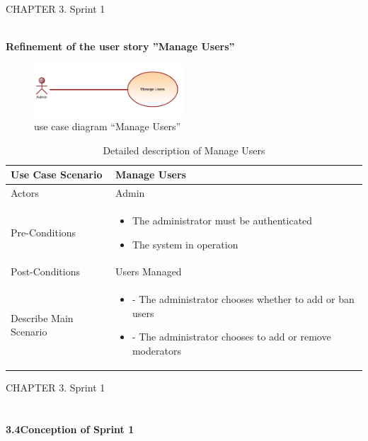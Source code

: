 \documentclass{article}
\begin{document}
{{{{{{{\newpage
\noindent
CHAPTER 3.  Sprint 1 \\
\underline{\hspace{\textwidth}} \vspace{0.2cm}\\
{\large \textbf{Refinement of the user story ”Manage Users”}
\begin{figure}[htbp]
    \centering
    \includegraphics[width=0.5\textwidth]{muse}
    \caption{use case diagram “Manage Users”}
    \label{fig:design2}
\end{figure}
\begin{table}[h]
    \centering
    \begin{tabularx}{\textwidth}{X|X}
        \toprule
        Use Case Scenario & Manage Users \\
        \midrule
        Actors & Admin \\
        \midrule
        Pre-Conditions & \begin{itemize}[label=$\bullet$]
\item The administrator must be authenticated 
\item The system in operation
 \end{itemize} \\
        \midrule
	 Post-Conditions & Users Managed  \\
        \midrule
        Describe Main Scenario &  \begin{itemize}[label=$\bullet$]
            \item - The administrator chooses whether to add or ban users
            \item- The administrator chooses to add or remove moderators
    
        \end{itemize} \\
        \bottomrule
    \end{tabularx}
    \caption{Detailed description of Manage Users}
    \label{tab:actors_roles}
\end{table}



\newpage
\noindent
CHAPTER 3.  Sprint 1 \\
\underline{\hspace{\textwidth}} \vspace{0.2cm}\\
\\{\Large \textbf{3.4\hspace{1em}Conception of Sprint 1}}\vspace{0.2cm}

}}}}}}}}
\end{document}
